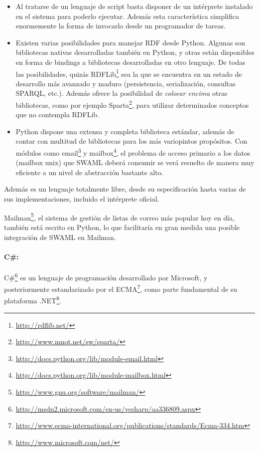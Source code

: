 \begin{itemize}
  \item Al tratarse de un lenguaje de script basta disponer de un intérprete 
	instalado en el sistema para poderlo ejecutar. Además esta característica
	simplifica enormemente la forma de invocarlo desde un programador de
	tareas.
  \item Existen varias posibilidades para manejar RDF desde Python. Algunas son
	bibliotecas nativas desarrolladas también en Python, y otras están
	disponibles en forma de bindings a bibliotecas desarrolladas en otro 
	lenguaje.
	De todas las posibilidades\cite{PracticalRDF}, quizás 
	RDFLib\footnote{\url{http://rdflib.net/}} sea la que se encuentra en 
	un estado de desarrollo más avanzado y maduro (persistencia, serialización, 
	consultas SPARQL, etc.).
	Además ofrece la posibilidad de \emph{colocar encima} otras bibliotecas,
	como por ejemplo Sparta\footnote{\url{http://www.mnot.net/sw/sparta/}},
	para utilizar determinados conceptos que no contempla RDFLib.
  \item Python dispone una extensa y completa biblioteca estándar, además de contar
	con multitud de bibliotecas para los más variopintos propósitos. Con módulos 
	como email\footnote{\url{http://docs.python.org/lib/module-email.html}} y
	mailbox\footnote{\url{http://docs.python.org/lib/module-mailbox.html}}, el
	problema de acceso primario a los datos (mailbox unix) que SWAML deberá
	consumir se verá resuelto de manera muy eficiente a un nivel de abstracción
	bastante alto.
\end{itemize}

Además es un lenguaje totalmente libre, desde su especificación hasta varias
de sus implementaciones, incluido el intérprete oficial.

Mailman\footnote{\url{http://www.gnu.org/software/mailman/}}, el sistema de gestión
de listas de correo más popular hoy en día, también está escrito en Python, lo que 
facilitaría en gran medida una posible integración de SWAML en Mailman.


\paragraph{C\#:}C\#\footnote{\url{http://msdn2.microsoft.com/en-us/vcsharp/aa336809.aspx}} 
es un lenguaje de programación desarrollado por Microsoft, y posteriormente estandarizado por el ECMA\footnote{\url{http://www.ecma-international.org/publications/standards/Ecma-334.htm}},
como parte fundamental de su plataforma .NET\footnote{\url{http://www.microsoft.com/net/}}.

